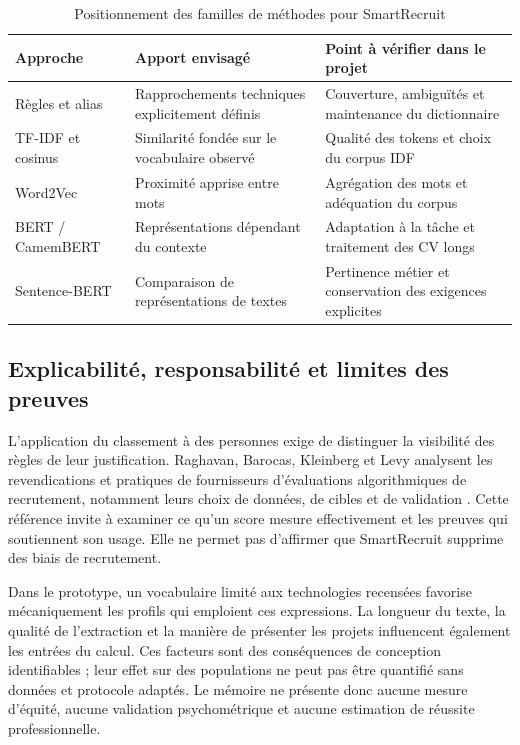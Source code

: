 \begin{table}[htbp]
\centering
\caption{Positionnement des familles de méthodes pour SmartRecruit}
\label{tab:positionnement-methodes}
\small
\begin{tabularx}{\textwidth}{@{}P{2.7cm}XX@{}}
\toprule
Approche & Apport envisagé & Point à vérifier dans le projet \\
\midrule
Règles et alias & Rapprochements techniques explicitement définis & Couverture, ambiguïtés et maintenance du dictionnaire \\
TF-IDF et cosinus & Similarité fondée sur le vocabulaire observé & Qualité des tokens et choix du corpus IDF \\
Word2Vec & Proximité apprise entre mots & Agrégation des mots et adéquation du corpus \\
BERT / CamemBERT & Représentations dépendant du contexte & Adaptation à la tâche et traitement des CV longs \\
Sentence-BERT & Comparaison de représentations de textes & Pertinence métier et conservation des exigences explicites \\
\bottomrule
\end{tabularx}
\end{table}

\subsection{Explicabilité, responsabilité et limites des preuves}

L'application du classement à des personnes exige de distinguer la visibilité des règles de leur justification. Raghavan, Barocas, Kleinberg et Levy analysent les revendications et pratiques de fournisseurs d'évaluations algorithmiques de recrutement, notamment leurs choix de données, de cibles et de validation \cite{raghavan2020}. Cette référence invite à examiner ce qu'un score mesure effectivement et les preuves qui soutiennent son usage. Elle ne permet pas d'affirmer que SmartRecruit supprime des biais de recrutement.

Dans le prototype, un vocabulaire limité aux technologies recensées favorise mécaniquement les profils qui emploient ces expressions. La longueur du texte, la qualité de l'extraction et la manière de présenter les projets influencent également les entrées du calcul. Ces facteurs sont des conséquences de conception identifiables ; leur effet sur des populations ne peut pas être quantifié sans données et protocole adaptés. Le mémoire ne présente donc aucune mesure d'équité, aucune validation psychométrique et aucune estimation de réussite professionnelle.

